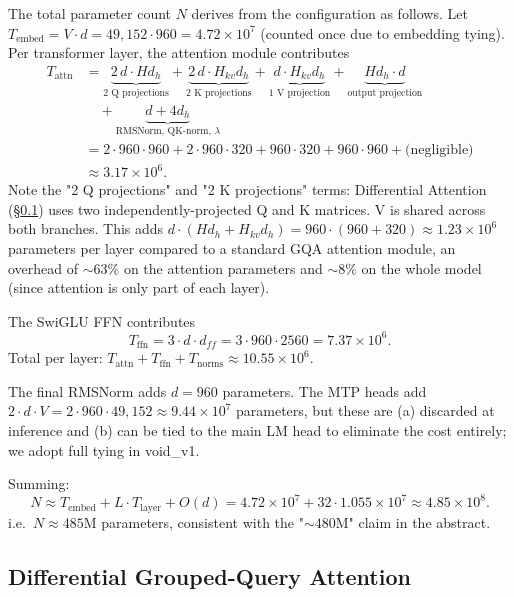 \documentclass[11pt,a4paper]{article}
\theoremstyle{definition}
\theoremstyle{remark}
\begin{document}
The total parameter count $N$ derives from the configuration as follows.
Let $T_\text{embed} = V \cdot d = 49{,}152 \cdot 960 = 4.72 \times 10^7$
(counted once due to embedding tying). Per transformer layer, the
attention module contributes
\begin{align}
T_\text{attn}
    &= \underbrace{2\, d \cdot H d_h}_{\text{2 Q projections}}
     + \underbrace{2\, d \cdot H_{kv} d_h}_{\text{2 K projections}}
     + \underbrace{d \cdot H_{kv} d_h}_{\text{1 V projection}}
     + \underbrace{H d_h \cdot d}_{\text{output projection}} \nonumber \\
    &\quad + \underbrace{d + 4 d_h}_{\text{RMSNorm, QK-norm, }\lambda} \nonumber \\
    &= 2 \cdot 960 \cdot 960 + 2 \cdot 960 \cdot 320 + 960 \cdot 320 + 960 \cdot 960
     + \text{(negligible)} \nonumber \\
    &\approx 3.17 \times 10^6.
\end{align}
Note the "2 Q projections" and "2 K projections" terms: Differential
Attention (\S\ref{sec:diffattn}) uses two independently-projected
Q and K matrices. V is shared across both branches. This adds
$d \cdot (H d_h + H_{kv} d_h) = 960 \cdot (960 + 320) \approx 1.23 \times 10^6$
parameters per layer compared to a standard GQA attention module, an
overhead of $\sim 63\%$ on the attention parameters and $\sim 8\%$ on the
whole model (since attention is only part of each layer).

The SwiGLU FFN contributes
\begin{equation}
T_\text{ffn} = 3 \cdot d \cdot d_{ff} = 3 \cdot 960 \cdot 2560 = 7.37 \times 10^6.
\end{equation}
Total per layer: $T_\text{attn} + T_\text{ffn} + T_\text{norms} \approx
10.55 \times 10^6$.

The final RMSNorm adds $d = 960$ parameters. The MTP heads add
$2 \cdot d \cdot V = 2 \cdot 960 \cdot 49{,}152 \approx 9.44 \times 10^7$
parameters, but these are (a) discarded at inference and (b) can be tied to
the main LM head to eliminate the cost entirely; we adopt full tying in
void\_v1.

Summing:
\begin{equation}
N \approx T_\text{embed} + L \cdot T_\text{layer} + O(d)
     = 4.72 \times 10^7 + 32 \cdot 1.055 \times 10^7
     \approx 4.85 \times 10^8.
\end{equation}
i.e.\ $N \approx 485$M parameters, consistent with the "$\sim 480$M" claim
in the abstract.

\subsection{Differential Grouped-Query Attention}
\label{sec:diffattn}
\end{document}
